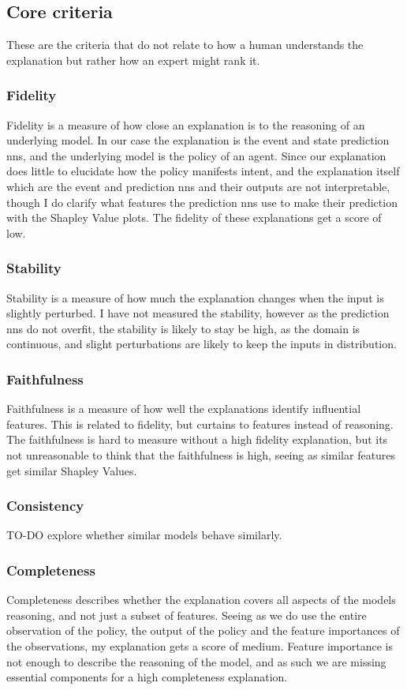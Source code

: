 \documentclass[UKenglish]{uiomasterthesis}
\begin{document}
\subsection{Core criteria}
These are the criteria that do not relate to how a human understands the explanation but rather how an expert might rank it.

\subsubsection{Fidelity}
Fidelity is a measure of how close an explanation is to the reasoning of an underlying model. In our case the explanation is the event and state prediction \acp{nn}, and the underlying model is the policy of an agent. Since our explanation does little to elucidate how the policy manifests intent, and the explanation itself which are the event and prediction \acp{nn} and their outputs are not interpretable, though I do clarify what features the prediction \acp{nn} use to make their prediction with the Shapley Value plots. The fidelity of these explanations get a score of low.

\subsubsection{Stability}
Stability is a measure of how much the explanation changes when the input is slightly perturbed. I have not measured the stability, however as the prediction \acp{nn} do not overfit, the stability is likely to stay be high, as the domain is continuous, and slight perturbations are likely to keep the inputs in distribution.

\subsubsection{Faithfulness}
Faithfulness is a measure of how well the explanations identify influential features. This is related to fidelity, but curtains to features instead of reasoning. The faithfulness is hard to measure without a high fidelity explanation, but its not unreasonable to think that the faithfulness is high, seeing as similar features get similar Shapley Values.


\subsubsection{Consistency}
TO-DO explore whether similar models behave similarly.

\subsubsection{Completeness}
Completeness describes whether the explanation covers all aspects of the models reasoning, and not just a subset of features. Seeing as we do use the entire observation of the policy, the output of the policy and the feature importances of the observations, my explanation gets a score of medium. Feature importance is not enough to describe the reasoning of the model, and as such we are missing essential components for a high completeness explanation.
\end{document}
